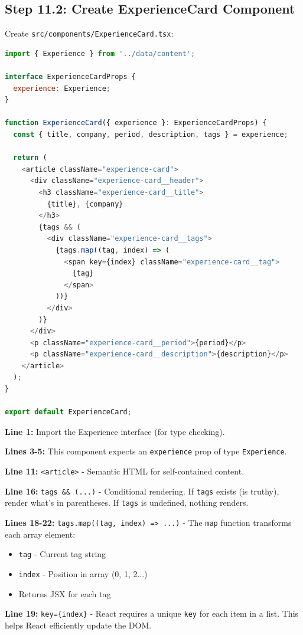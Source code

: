 \documentclass[12pt,a4paper]{article}
\begin{document}
\subsection{Step 11.2: Create ExperienceCard Component}

Create \texttt{src/components/ExperienceCard.tsx}:

\begin{lstlisting}[language=JavaScript,caption={src/components/ExperienceCard.tsx}]
import { Experience } from '../data/content';

interface ExperienceCardProps {
  experience: Experience;
}

function ExperienceCard({ experience }: ExperienceCardProps) {
  const { title, company, period, description, tags } = experience;

  return (
    <article className="experience-card">
      <div className="experience-card__header">
        <h3 className="experience-card__title">
          {title}, {company}
        </h3>
        {tags && (
          <div className="experience-card__tags">
            {tags.map((tag, index) => (
              <span key={index} className="experience-card__tag">
                {tag}
              </span>
            ))}
          </div>
        )}
      </div>
      <p className="experience-card__period">{period}</p>
      <p className="experience-card__description">{description}</p>
    </article>
  );
}

export default ExperienceCard;
\end{lstlisting}

\begin{explanation}
\textbf{Line 1:} Import the Experience interface (for type checking).

\textbf{Lines 3-5:} This component expects an \texttt{experience} prop of type \texttt{Experience}.

\textbf{Line 11:} \texttt{<article>} - Semantic HTML for self-contained content.

\textbf{Line 16:} \texttt{tags \&\& (...)} - Conditional rendering. If \texttt{tags} exists (is truthy), render what's in parentheses. If \texttt{tags} is undefined, nothing renders.

\textbf{Lines 18-22:} \texttt{tags.map((tag, index) => ...)} - The \texttt{map} function transforms each array element:
\begin{itemize}
    \item \texttt{tag} - Current tag string
    \item \texttt{index} - Position in array (0, 1, 2...)
    \item Returns JSX for each tag
\end{itemize}

\textbf{Line 19:} \texttt{key=\{index\}} - React requires a unique \texttt{key} for each item in a list. This helps React efficiently update the DOM.
\end{explanation}
\end{document}
